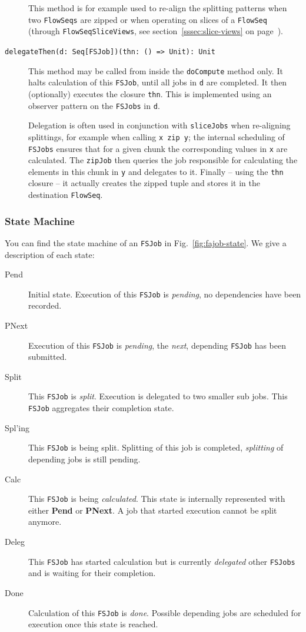 \documentclass[runningheads,a4paper,fleqn]{llncs}
\begin{document}
\begin{description}
    This method is for example used to re-align the splitting
    patterns when two \texttt{FlowSeqs} are zipped or when
    operating on slices of a \texttt{FlowSeq} (through
    \texttt{FlowSeqSliceViews}, see section~\ref{sssec:slice-views}
    on page~\pageref{sssec:slice-views}).
  \item[\texttt{delegateThen(d: Seq[FSJob])(thn: () => Unit): Unit}]
    This method may be called from inside the \texttt{doCompute}
    method only. It halts calculation of this \texttt{FSJob}, until
    all jobs in \texttt{d} are completed. It then (optionally)
    executes the closure \texttt{thn}. This is implemented using an
    observer pattern on the \texttt{FSJobs} in \texttt{d}.

    Delegation is often used in conjunction with \texttt{sliceJobs}
    when re-aligning splittings, for example when calling \texttt{x
      zip y}; the internal scheduling of \texttt{FSJobs} ensures 
    that for a given chunk the corresponding values in \texttt{x} are
    calculated. The \texttt{zipJob} then queries the job responsible
    for calculating the elements in this chunk in \texttt{y} and
    delegates to it. Finally -- using the \texttt{thn} closure -- it
    actually creates the zipped tuple and stores it in the destination 
    \texttt{FlowSeq}.
\end{description}

\subsubsection{State Machine}
You can find the state machine of an \texttt{FSJob} in
Fig.~\ref{fig:fajob-state}. We give a description of each state: 

\begin{description}
\item[Pend] Initial state. Execution of this \texttt{FSJob} is
  \emph{pending}, no dependencies have been recorded.
\item[PNext] Execution of this \texttt{FSJob} is
  \emph{pending}, the \emph{next}, depending \texttt{FSJob} has been
  submitted.
\item[Split] This \texttt{FSJob} is \emph{split}. Execution is
  delegated to two smaller sub jobs. This \texttt{FSJob} aggregates
  their completion state.
\item[Spl'ing] This \texttt{FSJob} is being split. Splitting of this
  job is completed, \emph{splitting} of depending jobs is still
  pending.
\item[Calc] This \texttt{FSJob} is being \emph{calculated}. This state
  is internally represented with either \textbf{Pend} or
  \textbf{PNext}. A job that started execution cannot be split
  anymore.
\item[Deleg] This \texttt{FSJob} has started calculation but is
  currently \emph{delegated} other \texttt{FSJobs} and is waiting for
  their completion.
\item[Done] Calculation of this \texttt{FSJob} is
  \emph{done}. Possible depending jobs are scheduled for execution
  once this state is reached.
\end{description}
\end{document}
